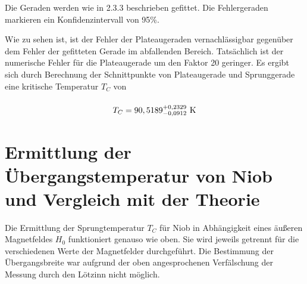\documentclass[bigchapter,colorback,accentcolor=tud4b,linedtoc,11pt]{tudreport}
\numberwithin{equation}{subsection}
\def\tol#1#2#3{\hbox{\rule{0pt}{15pt}${#1}^{+{#2}}_{-{#3}}$}}%
\begin{document}
Die Geraden werden wie in 2.3.3 beschrieben gefittet. Die Fehlergeraden markieren ein Konfidenzintervall von 95\%.
\begin{center}
\begin{figure}[h]
\end{figure}
\end{center}

Wie zu sehen ist, ist der Fehler der Plateaugeraden vernachlässigbar gegenüber dem Fehler der gefitteten Gerade im abfallenden Bereich. Tatsächlich ist der numerische Fehler für die Plateaugerade um den Faktor 20 geringer. Es ergibt sich durch Berechnung der Schnittpunkte von Plateaugerade und Sprunggerade eine kritische Temperatur $T_C$ von

\begin{equation}
  T_C = \tol{90,5189}{0,2329}{0,0912} \ \mathrm{K}
\end{equation}

\section{Ermittlung der Übergangstemperatur von Niob und Vergleich mit der Theorie}

Die Ermittlung der Sprungtemperatur \(T_C\) für Niob in Abhängigkeit eines äußeren Magnetfeldes \(H_0\) funktioniert genauso wie oben. Sie wird jeweils getrennt für die verschiedenen Werte der Magnetfelder durchgeführt. Die Bestimmung der Übergangsbreite war aufgrund der oben angesprochenen Verfälschung der Messung durch den Lötzinn nicht möglich.
\end{document}
